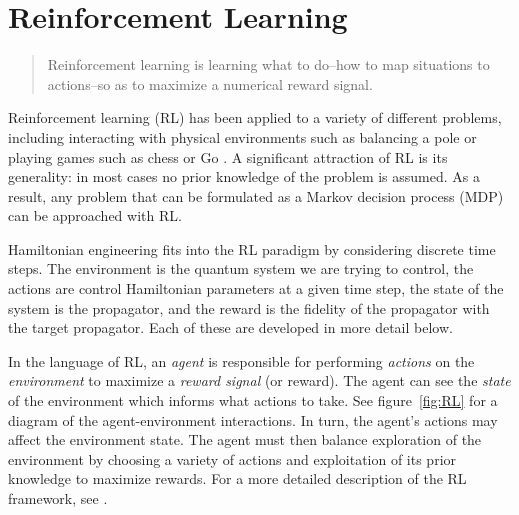
\section{Reinforcement Learning}



\begin{quote}
    Reinforcement learning is learning what to do--how to map situations to actions--so as to maximize a numerical reward signal. \cite{sutton2018reinforcement}
\end{quote}
Reinforcement learning  (RL) has been applied to a variety of different problems, including interacting with physical environments such as balancing a pole \cite{lillicrap2015continuous} or playing games such as chess or Go \cite{Silver1140}. A significant attraction of RL is its generality: in most cases no prior knowledge of the problem is assumed. As a result, any problem that can be formulated as a Markov decision process (MDP) can be approached with RL.

Hamiltonian engineering fits into the RL paradigm by considering discrete time steps. The environment is the quantum system we are trying to control, the actions are control Hamiltonian parameters at a given time step, the state of the system is the propagator, and the reward is the fidelity of the propagator with the target propagator.  Each of these are developed in more detail below.


In the language of RL, an \emph{agent} is responsible for performing \emph{actions} on the \emph{environment} to maximize a \emph{reward signal} (or reward). The agent can see the \emph{state} of the environment which informs what actions to take. See figure~\ref{fig:RL} for a diagram of the agent-environment interactions. In turn, the agent's actions may affect the environment state. The agent must then balance exploration of the environment by choosing a variety of actions and exploitation of its prior knowledge to maximize rewards.
For a more detailed description of the RL framework, see \cite{sutton2018reinforcement}.

